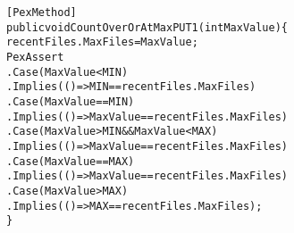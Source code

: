 \begin{figure}[t]
\begin{CodeOut}
\begin{alltt}
[PexMethod]
public void CountOverOrAtMaxPUT1(int MaxValue) \{
\hspace*{0.1in}recentFiles.MaxFiles = MaxValue;
\hspace*{0.1in}PexAssert
\hspace*{0.2in}.Case(MaxValue < MIN)
\hspace*{0.3in}.Implies(() => MIN == recentFiles.MaxFiles)
\hspace*{0.2in}.Case(MaxValue == MIN)
\hspace*{0.3in}.Implies(() => MaxValue == recentFiles.MaxFiles)
\hspace*{0.2in}.Case(MaxValue > MIN && MaxValue < MAX)
\hspace*{0.3in}.Implies(() => MaxValue == recentFiles.MaxFiles)
\hspace*{0.2in}.Case(MaxValue == MAX)
\hspace*{0.3in}.Implies(() => MaxValue == recentFiles.MaxFiles)
\hspace*{0.2in}.Case(MaxValue > MAX)
\hspace*{0.3in}.Implies(() => MAX == recentFiles.MaxFiles);            
\} 
\end{alltt}
\end{CodeOut}
\end{figure}

